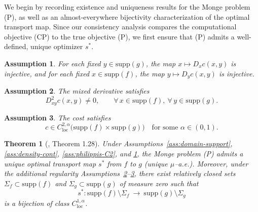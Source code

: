 \documentclass[12pt,leqno]{amsart}
\newtheorem{theorem}{Theorem}
\newtheorem{remark}{Remark}
\newtheorem{assumption}{Assumption}
\begin{document}
We begin by recording existence and uniqueness results for the Monge problem (P), as well as an almost-everywhere bijectivity characterization of the optimal transport map.
Since our consistency analysis compares the computational objective (CP) to the true objective (P), we first ensure that (P) admits a well-defined, unique optimizer $s^*$.

\begin{assumption}\label{ass:philippis-twist}
For each fixed $y\in \mathrm{supp}(g)$, the map $x\mapsto D_x c(x,y)$ is injective, and for each fixed
$x\in \mathrm{supp}(f)$, the map $y\mapsto D_y c(x,y)$ is injective. %
\end{assumption}

\begin{assumption}\label{ass:philippis-nondeg}
The mixed derivative satisfies
\[
D^2_{xy}c(x,y)\neq 0, \qquad \forall\, x\in \mathrm{supp}(f),\ \forall\, y\in \mathrm{supp}(g).
\]
\end{assumption}

\begin{assumption}\label{ass:philippis-Calpha}
The cost satisfies
\[
c \in C^{2,\alpha}_{\mathrm{loc}}\!\big(\mathrm{supp}(f)\times \mathrm{supp}(g)\big) \quad\text{for some }\alpha\in(0,1).
\]
\end{assumption}

\begin{theorem}[\cite{philippis2013regularity}, Theorem 1.28]\label{thm:philippis}
Under Assumptions~\ref{ass:domain-support}, \ref{ass:density-cont}, \ref{ass:philippis-C2}, and \ref{ass:philippis-twist},
the Monge problem (P) admits a unique optimal transport map $s^*$ from $f$ to $g$ (unique $\mu$--a.e.).
Moreover, under the additional regularity Assumptions~\ref{ass:philippis-nondeg}--\ref{ass:philippis-Calpha},
there exist relatively closed sets $\Sigma_f\subset \mathrm{supp}(f)$ and $\Sigma_g\subset \mathrm{supp}(g)$ of measure zero such that
\[
s^*:\mathrm{supp}(f)\setminus \Sigma_f \ \longrightarrow\ \mathrm{supp}(g)\setminus \Sigma_g
\]
is a bijection of class $C^{1,\alpha}_{\mathrm{loc}}$.
\end{theorem}
\end{document}
